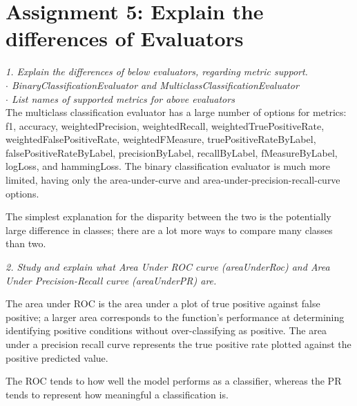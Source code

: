 \documentclass[]{article}
\begin{document}
\section*{Assignment 5: Explain the differences of Evaluators}
\emph{1. Explain the differences of below evaluators, regarding metric support. } \\
\emph{$\cdot$ BinaryClassificationEvaluator and MulticlassClassificationEvaluator} \\
\emph{$\cdot$ List names of supported metrics for above evaluators} \\

The multiclass classification evaluator has a large number of options for metrics: 
f1, 
accuracy, 
weightedPrecision, 
weightedRecall, 
weightedTruePositiveRate, 
weightedFalsePositiveRate, 
weightedFMeasure, 
truePositiveRateByLabel, 
falsePositiveRateByLabel, 
precisionByLabel, 
recallByLabel, 
fMeasureByLabel, 
logLoss, 
and hammingLoss. 
The binary classification evaluator is much more limited, having only the 
area-under-curve and area-under-precision-recall-curve options.

The simplest explanation for the disparity between the two is the potentially large difference in classes; 
there are a lot more ways to compare many classes than two.

\vspace{1em}

\emph{2. Study and explain what Area Under ROC curve (areaUnderRoc) and Area Under Precision-Recall curve (areaUnderPR) are. }

\vspace{1em}

The area under ROC is the area under a plot of true positive against false positive; 
a larger area corresponds to the function's performance at determining identifying positive conditions without over-classifying as positive.
The area under a precision recall curve represents the true positive rate plotted against the positive predicted value.

The ROC tends to how well the model performs as a classifier, whereas the PR tends to represent how meaningful a classification is.
\end{document}
